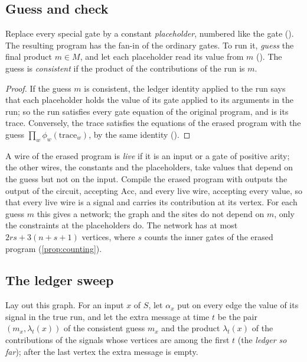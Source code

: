 \documentclass[11pt]{article}
\newcommand{\leanrefs}[1]{{\unskip\nobreak\hfil\penalty50\hskip1em\null\nobreak\hfil
  {\normalfont\small #1}\parfillskip=0pt\finalhyphendemerits=0\par}}
\newcommand{\leanref}[1]{\leanrefs{\lean{#1}}}
\theoremstyle{plain}
\theoremstyle{definition}
\theoremstyle{remark}
\newcommand{\Acc}{\mathrm{Acc}}
\begin{document}
\subsection{Guess and check}

Replace every special gate by a constant \emph{placeholder}, numbered like the gate
(). The resulting program has the fan-in of the ordinary gates. To run it,
\emph{guess} the final product $m \in M$, and let each placeholder read its value from $m$
(). The guess is \emph{consistent} if the product of the contributions
of the run is $m$.


\begin{proof}
If the guess $m$ is consistent, the ledger identity applied to the run says that each
placeholder holds the value of its gate applied to its arguments in the run; so the run
satisfies every gate equation of the original program, and is its trace. Conversely, the trace
satisfies the equations of the erased program with the guess $\prod_w \phi_w(\text{trace}_w)$,
by the same identity ().
\end{proof}

A wire of the erased program is \emph{live} if it is an input or a gate of positive arity; the
other wires, the constants and the placeholders, take values that depend on the guess but not on
the input. Compile the erased program with outputs the output of the circuit, accepting $\Acc$,
and every live wire, accepting every value, so that every live wire is a signal and carries its
contribution at its vertex. For each guess $m$ this gives a network; the graph and the sites do
not depend on $m$, only the constraints at the placeholders do. The network has at most
$2rs + 3(n + s + 1)$ vertices, where $s$ counts the inner gates of the erased program
(\cref{prop:counting}).

\subsection{The ledger sweep}

Lay out this graph. For an input $x$ of $S$, let $\alpha_x$ put on every edge the value of its
signal in the true run, and let the extra message at time $t$ be the pair $(m_x, \lambda_t(x))$
of the consistent guess $m_x$ and the product $\lambda_t(x)$ of the contributions of the signals
whose vertices are among the first $t$ (the \emph{ledger so far}); after the last vertex the
extra message is empty.
\end{document}
